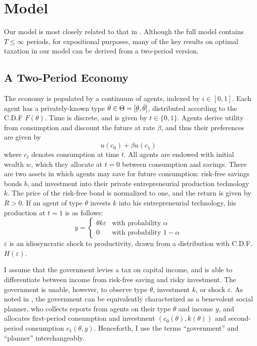 \documentclass[11pt]{article}
\newcommand{\ubar}[1]{\underaccent{\bar}{#1}}
\begin{document}
\section{Model}

Our model is most closely related to that in \cite{shourideh2014optimal}. Although the full model contains \( T\le\infty \) periods, for expositional purposes, many of the key results on optimal taxation in our model can be derived from a two-period version.

\subsection{A Two-Period Economy}

The economy is populated by a continuum of agents, indexed by \( i\in[0,1] \). Each agent has a privately-known type \( \theta\in\Theta=[\ubar{\theta},\bar{\theta}] \), distributed according to the C.D.F \( F(\theta) \). Time is discrete, and is given by \( t\in\{0,1\} \). Agents derive utility from consumption and discount the future at rate \( \beta \), and thus their preferences are given by 
\begin{equation}
    u(c_0) + \beta u(c_1)
\end{equation}
where \( c_t \) denotes consumption at time \( t \). All agents are endowed with initial wealth \( w \), which they allocate at \( t = 0 \) between consumption and savings. There are two assets in which agents may save for future consumption: risk-free savings bonds \( b \), and investment into their private entrepreneurial production technology \( k \). The price of the risk-free bond is normalized to one, and the return is given by \( R > 0 \). If an agent of type \( \theta \) invests \( k \) into his entrepreneurial technology, his production at \( t = 1 \) is as follows:
\begin{equation}
    y = \begin{cases}
        \theta k \varepsilon & \text{with probability }\alpha \\
        0 & \text{with probability }1 - \alpha
    \end{cases}
\end{equation}
\( \varepsilon \) is an idiosyncratic shock to productivity, drawn from a distribution with C.D.F. \( H(\varepsilon) \). 

I assume that the government levies a tax on capital income, and is able to differentiate between income from risk-free saving and risky investment. The government is unable, however, to observe type \( \theta \), investment \( k \), or shock \( \varepsilon \). As noted in \cite{mirrlees1971exploration}, the government can be equivalently characterized as a benevolent social planner, who collects reports from agents on their type \( \theta \) and income \( y \), and allocates first-period consumption and investment \( \left( c_0(\theta),k(\theta) \right) \) and second-period consumption \( c_1(\theta,y) \). Henceforth, I use the terms ``government'' and ``planner'' interchangeably. 
\end{document}
